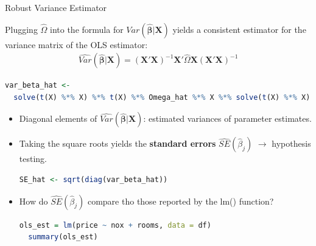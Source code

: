 \documentclass[11pt, aspectratio = 169]{beamer}
\begin{document}
\begin{frame}[fragile]{Robust Variance Estimator}

Plugging $\widehat{\Omega}$ into the formula for $Var(\hat{\boldsymbol{\beta}}|\mathbf{X})$ yields a consistent estimator for the variance matrix of the OLS estimator:
\begin{align*}
   \widehat{Var}(\hat{\boldsymbol{\beta}}|\mathbf{X}) = (\mathbf{X}'\mathbf{X})^{-1}\mathbf{X}'\hat{\Omega}\mathbf{X}(\mathbf{X}'\mathbf{X})^{-1}
\end{align*}
\begin{lstlisting}[language=R]      
  var_beta_hat <- 
  solve(t(X) %*% X) %*% t(X) %*% Omega_hat %*% X %*% solve(t(X) %*% X)
\end{lstlisting}
\pause
\begin{itemize}
  \item Diagonal elements of $\widehat{Var}(\hat{\boldsymbol{\beta}}|\mathbf{X})$: estimated variances of parameter estimates.
  \item Taking the square roots yields the \color{teal}\textbf{standard errors} $\widehat{SE}(\hat{\beta}_j)$ \color{black} $\rightarrow$ hypothesis testing.
  \begin{lstlisting}[language=R]      
  SE_hat <- sqrt(diag(var_beta_hat))
  \end{lstlisting}  \pause
  \item[$\rightarrow$] How do $\widehat{SE}(\hat{\beta}_j)$ compare tho those reported by the lm() function?
  \begin{lstlisting}[language=R]      
  ols_est = lm(price ~ nox + rooms, data = df)
  summary(ols_est)
  \end{lstlisting} 
\end{itemize}
\end{frame}
\end{document}
